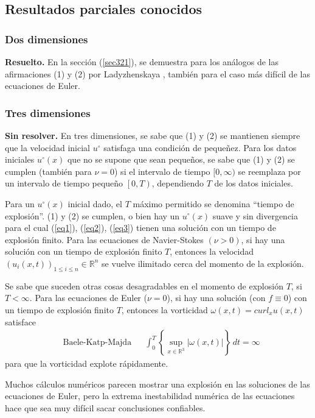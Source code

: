 \subsection{Resultados parciales conocidos}
\subsubsection{Dos dimensiones}
\textbf{Resuelto.} En la sección (\ref{sec321}), se demuestra para los análogos de las afirmaciones (1) y (2) por Ladyzhenskaya \cite{ladyzhenskaya1969mathematical}, también para el caso más difícil de las ecuaciones de Euler. 
\subsubsection{Tres dimensiones}
\textbf{Sin resolver.} En tres dimensiones, se sabe que (1) y (2) se mantienen siempre que la velocidad inicial $u^{\circ}$ satisfaga una condición de pequeñez. Para los datos iniciales $u^{\circ}(x)$ que no se supone que sean pequeños, se sabe que (1) y (2) se cumplen (también para $\nu=0$) si el intervalo de tiempo $[0,\infty)$ se reemplaza por un intervalo de tiempo pequeño $\left[0, T\right)$, dependiendo $T$ de los datos iniciales.

Para un $u^{\circ}(x)$ inicial dado, el $T$ máximo permitido se denomina ``tiempo de explosión''. (1) y (2) se cumplen, o bien hay un $u^{\circ}(x)$ suave y sin divergencia para el cual (\ref{eq1}), (\ref{eq2}), (\ref{eq3}) tienen una solución con un tiempo de explosión finito. Para las ecuaciones de Navier-Stokes $(\nu > 0)$, si hay una solución con un tiempo de explosión finito $T$, entonces la velocidad $\left(u_i(x,t)\right)_{1\leq i \leq n}\in \mathbb{R}^n$ se vuelve ilimitado cerca del momento de la explosión.

Se sabe que suceden otras cosas desagradables en el momento de explosión $T$, si $T < \infty$. Para las ecuaciones de Euler ($\nu = 0$), si hay una solución (con $f \equiv  0$) con un tiempo de explosión finito $T$, entonces la vorticidad $\omega(x, t) = curl_x u(x, t)$ satisface
\begin{align}
    &\text{Baele-Katp-Majda}&&\int_0^T \left\{ \sup_{x\in \mathbb{R}^3}\left\lvert \omega(x,t)\right\rvert\right\}\, dt = \infty
\end{align}
para que la vorticidad explote rápidamente.

Muchos cálculos numéricos parecen mostrar una explosión en las soluciones de las ecuaciones de Euler, pero la extrema inestabilidad numérica de las ecuaciones hace que sea muy difícil sacar conclusiones confiables.

